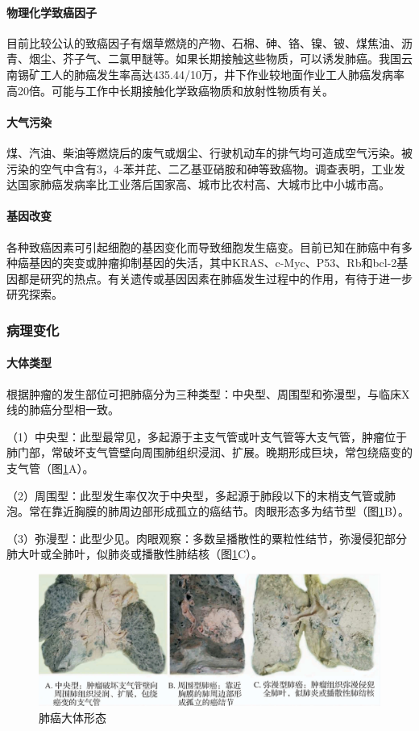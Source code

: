 \paragraph{物理化学致癌因子}
目前比较公认的致癌因子有烟草燃烧的产物、石棉、砷、铬、镍、铍、煤焦油、沥青、烟尘、芥子气、二氯甲醚等。如果长期接触这些物质，可以诱发肺癌。我国云南锡矿工人的肺癌发生率高达435.44/10万，井下作业较地面作业工人肺癌发病率高20倍。可能与工作中长期接触化学致癌物质和放射性物质有关。

\paragraph{大气污染}
煤、汽油、柴油等燃烧后的废气或烟尘、行驶机动车的排气均可造成空气污染。被污染的空气中含有3，4-苯并芘、二乙基亚硝胺和砷等致癌物。调查表明，工业发达国家肺癌发病率比工业落后国家高、城市比农村高、大城市比中小城市高。

\paragraph{基因改变}
各种致癌因素可引起细胞的基因变化而导致细胞发生癌变。目前已知在肺癌中有多种癌基因的突变或肿瘤抑制基因的失活，其中KRAS、c-Myc、P53、Rb和bcl-2基因都是研究的热点。有关遗传或基因因素在肺癌发生过程中的作用，有待于进一步研究探索。

\subsubsection{病理变化}

\paragraph{大体类型}
根据肿瘤的发生部位可把肺癌分为三种类型：中央型、周围型和弥漫型，与临床X线的肺癌分型相一致。

（1）中央型：此型最常见，多起源于主支气管或叶支气管等大支气管，肿瘤位于肺门部，常破坏支气管壁向周围肺组织浸润、扩展。晚期形成巨块，常包绕癌变的支气管（图\ref{fig7-15}A）。

（2）周围型：此型发生率仅次于中央型，多起源于肺段以下的末梢支气管或肺泡。常在靠近胸膜的肺周边部形成孤立的癌结节。肉眼形态多为结节型（图\ref{fig7-15}B）。

（3）弥漫型：此型少见。肉眼观察：多数呈播散性的粟粒性结节，弥漫侵犯部分肺大叶或全肺叶，似肺炎或播散性肺结核（图\ref{fig7-15}C）。

\begin{figure}[!htbp]
 \centering
 \includegraphics{./images/Image00124.jpg}
 \captionsetup{justification=centering}
 \caption{肺癌大体形态}
 \label{fig7-15}
  \end{figure} 

